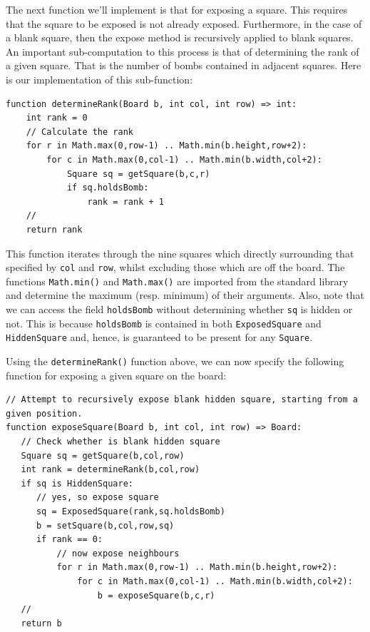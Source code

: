 The next function we'll implement is that for exposing a square.  This requires that the square to be exposed is not already exposed.  Furthermore, in the case of a blank square, then the expose method is recursively applied to blank squares.  An important sub-computation to this process is that of determining the rank of a given square.  That is the number of bombs contained in adjacent squares.  Here is our implementation of this sub-function:

\begin{lstlisting}
function determineRank(Board b, int col, int row) => int:
    int rank = 0
    // Calculate the rank
    for r in Math.max(0,row-1) .. Math.min(b.height,row+2):
        for c in Math.max(0,col-1) .. Math.min(b.width,col+2):
            Square sq = getSquare(b,c,r)
            if sq.holdsBomb:
                rank = rank + 1
    //
    return rank
\end{lstlisting}

This function iterates through the nine squares which directly surrounding that specified by \lstinline{col} and \lstinline{row}, whilst excluding those which are off the board.  The functions \lstinline{Math.min()} and \lstinline{Math.max()} are imported from the standard library and determine the maximum (resp. minimum) of their arguments.  Also, note that we can access the field \lstinline{holdsBomb} without determining whether \lstinline{sq} is hidden or not.  This is because \lstinline{holdsBomb} is contained in both \lstinline{ExposedSquare} and \lstinline{HiddenSquare} and, hence, is guaranteed to be present for any \lstinline{Square}.

Using the \lstinline{determineRank()} function above, we can now specify the following function for exposing a given square on the board:

\begin{lstlisting}
// Attempt to recursively expose blank hidden square, starting from a given position.
function exposeSquare(Board b, int col, int row) => Board:
   // Check whether is blank hidden square
   Square sq = getSquare(b,col,row)
   int rank = determineRank(b,col,row)
   if sq is HiddenSquare:       
      // yes, so expose square
      sq = ExposedSquare(rank,sq.holdsBomb)
      b = setSquare(b,col,row,sq)
      if rank == 0:
          // now expose neighbours
          for r in Math.max(0,row-1) .. Math.min(b.height,row+2):
              for c in Math.max(0,col-1) .. Math.min(b.width,col+2):
                  b = exposeSquare(b,c,r)
   //
   return b
\end{lstlisting}

